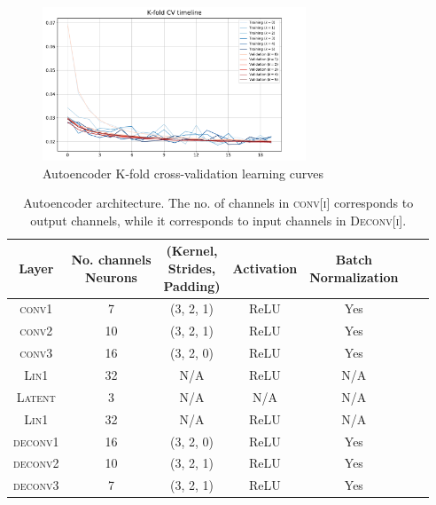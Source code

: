 \documentclass[11pt]{article} %
\begin{document}
\begin{figure}
    \centering
    \includegraphics[width=0.7\textwidth]{res/learning_curve_KFCV.pdf}
    \caption{Autoencoder K-fold cross-validation learning curves}
    \label{fig:autoencoder_results}
\end{figure}

\begin{table}
\centering
    \begin{tabular}{ccccccc}
        Layer & \thead{No. channels \\ Neurons} & \thead{(Kernel,\\ Strides,\\ Padding)} & Activation & \thead{Batch \\ Normalization}\\
        \hline
        \textsc{conv1} & 7 & (3, 2, 1) & ReLU & Yes\\
        \textsc{conv2} & 10 & (3, 2, 1) & ReLU & Yes\\
        \textsc{conv3} & 16 & (3, 2, 0) & ReLU & Yes\\
        \textsc{Lin1} & 32 & N/A & ReLU & N/A \\
        \hdashline
        \textsc{Latent} & 3 & N/A & N/A & N/A \\
        \hdashline
        \textsc{Lin1} & 32 & N/A & ReLU & N/A \\
        \textsc{deconv1} & 16 & (3, 2, 0) & ReLU & Yes\\
        \textsc{deconv2} & 10 & (3, 2, 1) & ReLU & Yes\\
        \textsc{deconv3} & 7 & (3, 2, 1) & ReLU & Yes\\
    \end{tabular}
    \caption{Autoencoder architecture. The no. of channels in \textsc{conv[i]} corresponds to output channels, while it corresponds to input channels in \textsc{Deconv[i]}.}
\end{table}
\end{document}
